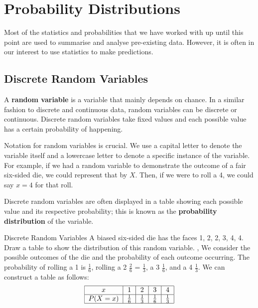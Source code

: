 \chapter{Probability Distributions}
Most of the statistics and probabilities that we have worked with up until this point are used to summarise and analyse pre-existing data. However, it is often in our interest to use statistics to make predictions.

\section{Discrete Random Variables}
A \textbf{random variable} is a variable that mainly depends on chance. In a similar fashion to discrete and continuous data, random variables can be discrete or continuous. Discrete random variables take fixed values and each possible value has a certain probability of happening.

Notation for random variables is crucial. We use a capital letter to denote the variable itself and a lowercase letter to denote a specific instance of the variable. For example, if we had a random variable to demonstrate the outcome of a fair six-sided die, we could represent that by $X$. Then, if we were to roll a 4, we could say $x = 4$ for that roll.

Discrete random variables are often displayed in a table showing each possible value and its respective probability; this is known as the \textbf{probability distribution} of the variable.
\begin{example}{Discrete Random Variables}
A biased six-sided die has the faces 1, 2, 2, 3, 4, 4. Draw a table to show the distribution of this random variable.
\sep
We consider the possible outcomes of the die and the probability of each outcome occurring. The probability of rolling a 1 is $\frac{1}{6}$, rolling a 2 $\frac{2}{6}$ = $\frac{1}{3}$, a 3 $\frac{1}{6}$, and a 4 $\frac{1}{3}$.  We can construct a table as follows:
\begin{align}
\begin{tabular}{ |c|c|c|c|c| } 
 \hline
 $x$ & 1 & 2 & 3 & 4 \\ 
 \hline
 $P(X=x)$ & $\frac{1}{6}$ & $\frac{1}{3}$ & $\frac{1}{6}$ & $\frac{1}{3}$ \\ 
 \hline
\end{tabular}
\end{align}
\end{example}

